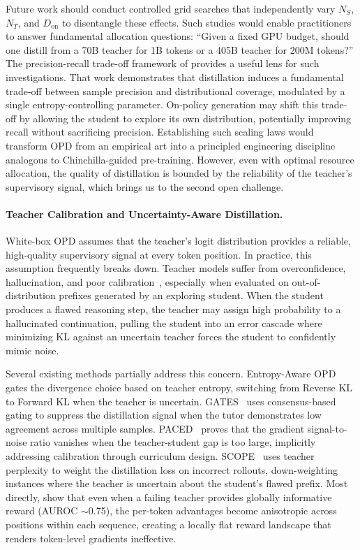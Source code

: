\documentclass{article} %
\begin{document}
Future work should conduct controlled grid searches that independently vary $N_S$, $N_T$, and $D_{\text{on}}$ to disentangle these effects. Such studies would enable practitioners to answer fundamental allocation questions: ``Given a fixed GPU budget, should one distill from a 70B teacher for 1B tokens or a 405B teacher for 200M tokens?'' The precision-recall trade-off framework of \citet{2505.13111} provides a useful lens for such investigations. That work demonstrates that distillation induces a fundamental trade-off between sample precision and distributional coverage, modulated by a single entropy-controlling parameter. On-policy generation may shift this trade-off by allowing the student to explore its own distribution, potentially improving recall without sacrificing precision. Establishing such scaling laws would transform OPD from an empirical art into a principled engineering discipline analogous to Chinchilla-guided pre-training. However, even with optimal resource allocation, the quality of distillation is bounded by the reliability of the teacher's supervisory signal, which brings us to the second open challenge.

\paragraph{Teacher Calibration and Uncertainty-Aware Distillation.}
White-box OPD assumes that the teacher's logit distribution provides a reliable, high-quality supervisory signal at every token position. In practice, this assumption frequently breaks down. Teacher models suffer from overconfidence, hallucination, and poor calibration~\citep{2603.07079}, especially when evaluated on out-of-distribution prefixes generated by an exploring student. When the student produces a flawed reasoning step, the teacher may assign high probability to a hallucinated continuation, pulling the student into an error cascade where minimizing KL against an uncertain teacher forces the student to confidently mimic noise.

Several existing methods partially address this concern. Entropy-Aware OPD~\citep{2603.07079} gates the divergence choice based on teacher entropy, switching from Reverse KL to Forward KL when the teacher is uncertain. GATES~\citep{2602.20574} uses consensus-based gating to suppress the distillation signal when the tutor demonstrates low agreement across multiple samples. PACED~\citep{2603.11178} proves that the gradient signal-to-noise ratio vanishes when the teacher-student gap is too large, implicitly addressing calibration through curriculum design. SCOPE~\citep{zheng2026scope} uses teacher perplexity to weight the distillation loss on incorrect rollouts, down-weighting instances where the teacher is uncertain about the student's flawed prefix. Most directly, \citet{li2026rethinking} show that even when a failing teacher provides globally informative reward (AUROC $\sim$0.75), the per-token advantages become anisotropic across positions within each sequence, creating a locally flat reward landscape that renders token-level gradients ineffective.
\end{document}

